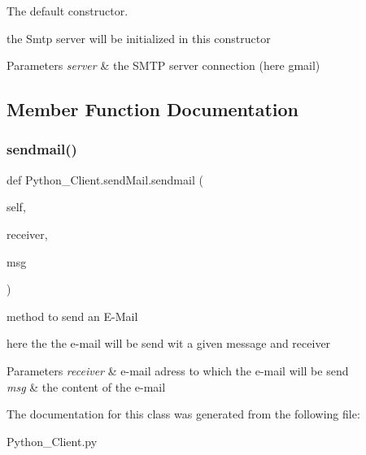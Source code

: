 The default constructor. 

the Smtp server will be initialized in this constructor


\begin{DoxyParams}{Parameters}
{\em server} & the S\+M\+TP server connection (here gmail) \\
\hline
\end{DoxyParams}


\subsection{Member Function Documentation}
\mbox{\label{class_python___client_1_1send_mail_a5d245cd00e2df903015928d0902632d8}} 
\subsubsection{\texorpdfstring{sendmail()}{sendmail()}}
{\footnotesize\ttfamily def Python\+\_\+\+Client.\+send\+Mail.\+sendmail (\begin{DoxyParamCaption}\item[{}]{self,  }\item[{}]{receiver,  }\item[{}]{msg }\end{DoxyParamCaption})}



method to send an E-\/\+Mail 

here the the e-\/mail will be send wit a given message and receiver


\begin{DoxyParams}{Parameters}
{\em receiver} & e-\/mail adress to which the e-\/mail will be send \\
\hline
{\em msg} & the content of the e-\/mail \\
\hline
\end{DoxyParams}


The documentation for this class was generated from the following file\+:\begin{DoxyCompactItemize}
\item 
Python\+\_\+\+Client.\+py\end{DoxyCompactItemize}
